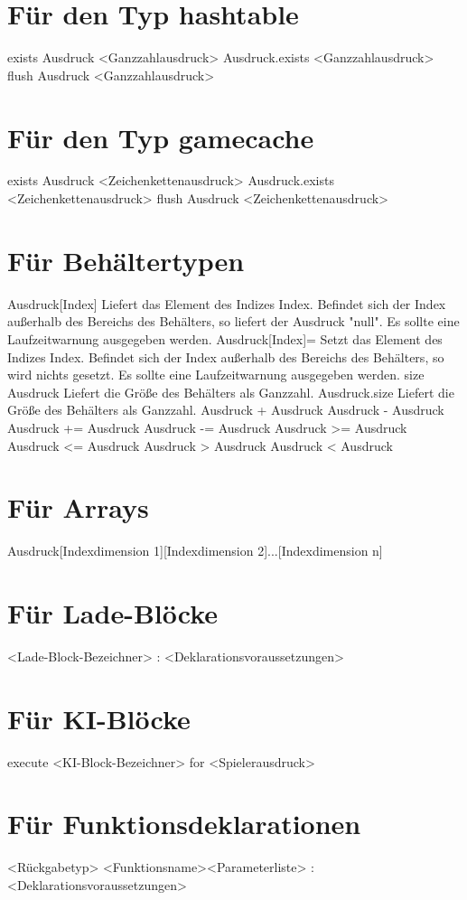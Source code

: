 \section{Für den Typ hashtable}
exists Ausdruck <Ganzzahlausdruck>
Ausdruck.exists <Ganzzahlausdruck>
flush Ausdruck <Ganzzahlausdruck>

\section{Für den Typ gamecache}
exists Ausdruck <Zeichenkettenausdruck>
Ausdruck.exists <Zeichenkettenausdruck>
flush Ausdruck <Zeichenkettenausdruck>

\section{Für Behältertypen}
Ausdruck[Index]					Liefert das Element des Indizes Index. Befindet sich der Index außerhalb des Bereichs des Behälters, so liefert der Ausdruck "null". Es sollte eine Laufzeitwarnung ausgegeben werden.
Ausdruck[Index]=				Setzt das Element des Indizes Index. Befindet sich der Index außerhalb des Bereichs des Behälters, so wird nichts gesetzt. Es sollte eine Laufzeitwarnung ausgegeben werden.
size Ausdruck					Liefert die Größe des Behälters als Ganzzahl.
Ausdruck.size					Liefert die Größe des Behälters als Ganzzahl.
Ausdruck + Ausdruck
Ausdruck - Ausdruck
Ausdruck += Ausdruck
Ausdruck -= Ausdruck
Ausdruck >= Ausdruck
Ausdruck <= Ausdruck
Ausdruck > Ausdruck
Ausdruck < Ausdruck

\section{Für Arrays}
Ausdruck[Indexdimension 1][Indexdimension 2]...[Indexdimension n]

\section{Für Lade-Blöcke}
<Lade-Block-Bezeichner> : <Deklarationsvoraussetzungen>

\section{Für KI-Blöcke}
execute <KI-Block-Bezeichner> for <Spielerausdruck>

\section{Für Funktionsdeklarationen}
<Rückgabetyp> <Funktionsname><Parameterliste> : <Deklarationsvoraussetzungen>

